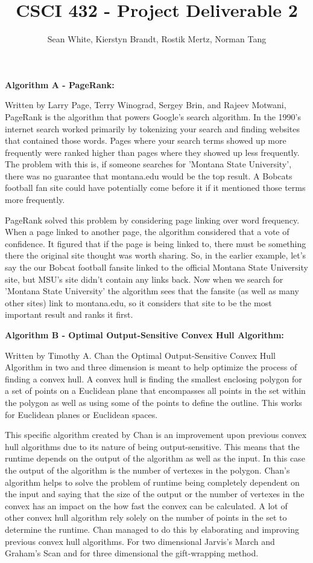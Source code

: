 \documentclass[12pt]{article}
\author{Sean White, Kierstyn Brandt, Rostik Mertz, Norman Tang}
\title{CSCI 432 - Project Deliverable 2}
\begin{document}
\maketitle

\noindent
\textbf{Algorithm A - PageRank:}\smallskip

Written by Larry Page, Terry Winograd, Sergey Brin, and Rajeev Motwani, PageRank is the algorithm that powers Google's search algorithm. In the 1990's internet search worked primarily by tokenizing your search and finding websites that contained those words. Pages where your search terms showed up more frequently were ranked higher than pages where they showed up less frequently. The problem with this is, if someone searches for 'Montana State University', there was no guarantee that montana.edu would be the top result. A Bobcats football fan site could have potentially come before it if it mentioned those terms more frequently.

PageRank solved this problem by considering page linking over word frequency. When a page linked to another page, the algorithm considered that a vote of confidence. It figured that if the page is being linked to, there must be something there the original site thought was worth sharing. So, in the earlier example, let's say the our Bobcat football fansite linked to the official Montana State University site, but MSU's site didn't contain any links back. Now when we search for 'Montana State University' the algorithm sees that the fansite (as well as many other sites) link to montana.edu, so it considers that site to be the most important result and ranks it first.
\bigskip

\noindent
\textbf{Algorithm B - Optimal Output-Sensitive Convex Hull Algorithm:}\smallskip

Written by Timothy A. Chan the Optimal Output-Sensitive Convex Hull Algorithm in two and three dimension is meant to help optimize the process of finding a convex hull. A convex hull is finding the smallest enclosing polygon for a set of points on a Euclidean plane that encompasses all points in the set within the polygon as well as using some of the points to define the outline. This works for Euclidean planes or Euclidean spaces. 

This specific algorithm created by Chan is an improvement upon previous convex hull algorithms due to its nature of being output-sensitive. This means that the runtime depends on the output of the algorithm as well as the input. In this case the output of the algorithm is the number of vertexes in the polygon. Chan's algorithm helps to solve the problem of runtime being completely dependent on the input and saying that the size of the output or the number of vertexes in the convex has an impact on the how fast the convex can be calculated. A lot of other convex hull algorithm rely solely on the number of points in the set to determine the runtime. Chan managed to do this by elaborating and improving previous convex hull algorithms. For two dimensional Jarvis's March and Graham's Scan and for three dimensional the gift-wrapping method. 
\end{document}
